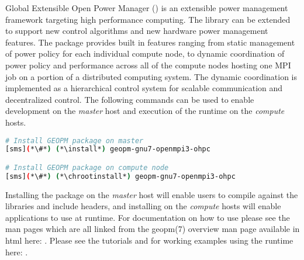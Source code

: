 Global Extensible Open Power Manager (\GEOPM{}) is an extensible power
management framework targeting high performance computing.  The library can be
extended to support new control algorithms and new hardware power management
features.  The \GEOPM{} package provides built in features ranging from static
management of power policy for each individual compute node, to dynamic
coordination of power policy and performance across all of the compute nodes
hosting one MPI job on a portion of a distributed computing system.  The
dynamic coordination is implemented as a hierarchical control system for
scalable communication and decentralized control.  The following
commands can be used to enable development on the {\em master} host and
execution of the \GEOPM{} runtime on the {\em compute} hosts.

\begin{lstlisting}[language=bash,keywords={},upquote=true]
# Install GEOPM package on master
[sms](*\#*) (*\install*) geopm-gnu7-openmpi3-ohpc

# Install GEOPM package on compute node
[sms](*\#*) (*\chrootinstall*) geopm-gnu7-openmpi3-ohpc
\end{lstlisting}

\noindent Installing the \GEOPM{} package on the {\em master} host will enable
users to compile against the \GEOPM{} libraries and include headers, and
installing on the {\em compute} hosts will enable applications to use
\GEOPM{} at runtime.  For documentation on how to use \GEOPM{} please see
the \GEOPM{} man pages which are all linked from the geopm(7) overview
man page available in html here:
\href{http://geopm.github.io/man/geopm.7.html}{\color{blue}{http://geopm.github.io/man/geopm.7.html}}.
Please see the \GEOPM{} tutorials and for working examples using the
\GEOPM{} runtime here:
\href{https://github.com/geopm/geopm/tree/dev/tutorial}{\color{blue}{https://github.com/geopm/geopm/tree/dev/tutorial}}.
